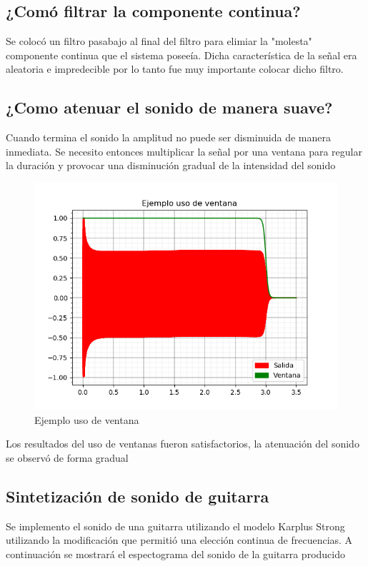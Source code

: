 \documentclass[assd_tp2_main.tex]{subfiles}
\begin{document}
\subsection{¿Comó filtrar la componente continua?}
Se colocó un filtro pasabajo al final del filtro para elimiar la "molesta" componente continua que el sistema poseeía. Dicha característica de la señal era aleatoria e impredecible por lo tanto fue muy importante colocar dicho filtro.

\subsection{¿Como atenuar el sonido de manera suave?}
Cuando termina el sonido la amplitud no puede ser disminuida de manera inmediata. Se necesito entonces multiplicar la señal por una ventana para regular la duración y provocar una disminución gradual de la intensidad del sonido

\begin{figure}[H]
	\begin{center}
	\includegraphics[scale=0.5]{graficos/ejemplo_uso_ventana.png}
	\caption{Ejemplo uso de ventana}

	\end{center}
\end{figure}
Los resultados del uso de ventanas fueron satisfactorios, la atenuación del sonido se observó de forma gradual

\subsection{Sintetización de sonido de guitarra}
Se implemento el sonido de una guitarra utilizando el modelo Karplus Strong utilizando la modificación que permitió una elección continua de frecuencias. A continuación se mostrará el espectograma del sonido de la guitarra producido
\end{document}
